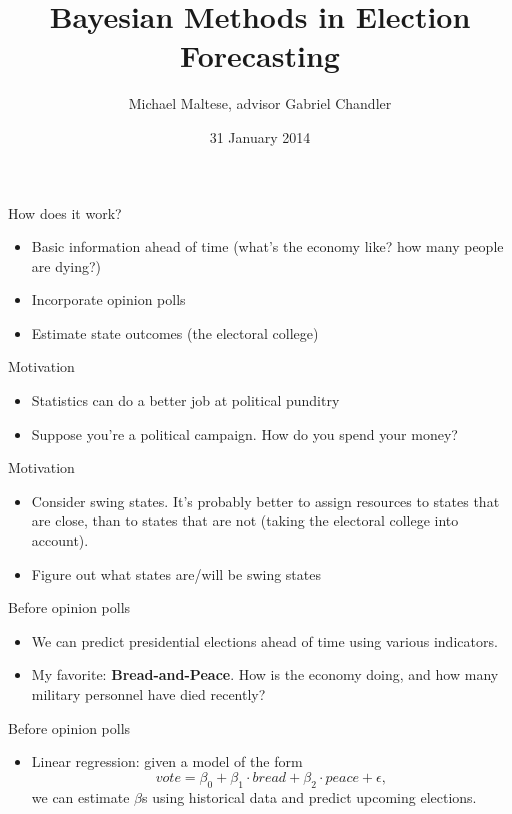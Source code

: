 \documentclass[14pt, t]{beamer}
\title{\textbf{Bayesian Methods in Election Forecasting}}
\author{Michael Maltese, advisor Gabriel Chandler}
\date{31 January 2014}
\begin{document}
\begin{frame}
\titlepage
\end{frame}

\begin{frame}{How does it work?}
\begin{itemize}
	\item Basic information ahead of time (what's the economy like? how many people are dying?)
	\item Incorporate opinion polls
	\item Estimate state outcomes (the electoral college)
\end{itemize}
\end{frame}

\begin{frame}{Motivation}
\begin{itemize}
	\item Statistics can do a better job at political punditry
	\item Suppose you're a political campaign. How do you spend your money?
\end{itemize}
\end{frame}

\begin{frame}{Motivation}
\begin{itemize}
	\item Consider swing states. It's probably better to assign resources to states that are close, than to states that are not (taking the electoral college into account).
	\item Figure out what states are/will be swing states
\end{itemize}
\end{frame}

\begin{frame}{Before opinion polls}
\begin{itemize}
	\item We can predict presidential elections ahead of time using various indicators.
	\item My favorite: \textbf{Bread-and-Peace}. How is the economy doing, and how many military personnel have died recently?
\end{itemize}
\end{frame}

\begin{frame}{Before opinion polls}
\begin{itemize}
\item Linear regression: given a model of the form
\begin{equation*}
		vote = \beta_0 + \beta_1\cdot bread + \beta_2\cdot peace + \epsilon,
	\end{equation*}
	we can estimate \(\beta\)s using historical data and predict upcoming elections.
\end{itemize}
\end{frame}
\end{document}

